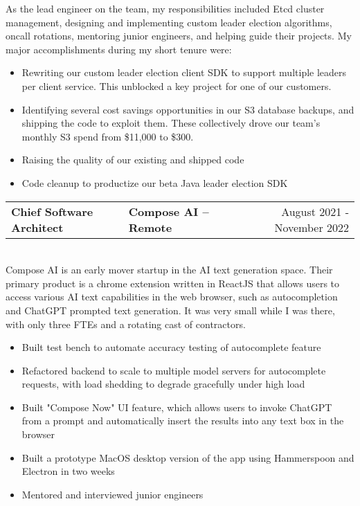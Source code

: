 \documentclass{res}
\newlength{\vsep}
\begin{document}
\begin{resume}
   As the lead engineer on the team, my responsibilities included Etcd cluster management, designing and implementing custom leader election algorithms, oncall rotations, mentoring junior engineers, and helping guide their projects.
   My major accomplishments during my short tenure were:
   \begin{itemize}
   \item Rewriting our custom leader election client SDK to support multiple leaders per client service. This unblocked a key project for one of our customers.
   \item Identifying several cost savings opportunities in our S3 database backups, and shipping the code to exploit them. These collectively drove our team's monthly S3 spend from \$11,000 to \$300.
   \item Raising the quality of our existing and shipped code
   \item Code cleanup to productize our beta Java leader election SDK
   \end{itemize}
   \vspace{\vsep}

   \begin{tabularx}{\textwidth}{@{}>{\bf}l>{\large\bf\centering\arraybackslash}Xr@{}}
   Chief Software Architect & Compose AI -- Remote & August 2021 - November 2022\vspace{\vsep}\\
   \end{tabularx}\\
   Compose AI is an early mover startup in the AI text generation space.  Their primary product is a chrome extension written in ReactJS that allows users to access various AI text capabilities in the web browser, such as autocompletion and ChatGPT prompted text generation.  It was very small while I was there, with only three FTEs and a rotating cast of contractors.
   \begin{itemize}
   \item Built test bench to automate accuracy testing of autocomplete feature
   \item Refactored backend to scale to multiple model servers for autocomplete requests, with load shedding to degrade gracefully under high load
   \item Built "Compose Now" UI feature, which allows users to invoke ChatGPT from a prompt and automatically insert the results into any text box in the browser
   \item Built a prototype MacOS desktop version of the app using Hammerspoon and Electron in two weeks
   \item Mentored and interviewed junior engineers
   \end{itemize}
   \vspace{\vsep}


\end{resume}
\end{document}

